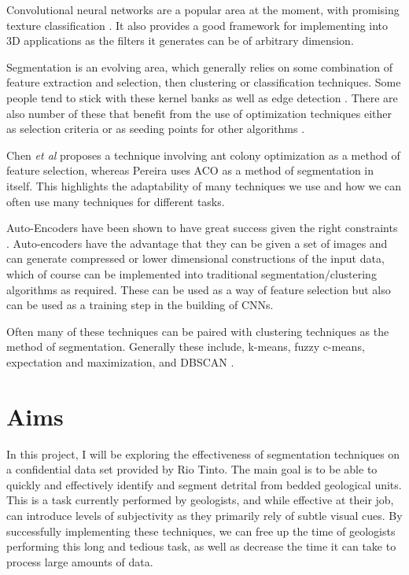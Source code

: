 \documentclass[12pt, a4paper]{article}
\begin{document}
Convolutional neural networks are a popular area at the moment, with promising texture classification \cite{cimpoi2015deep}. It also provides a good framework for implementing into 3D applications as the filters it generates can be of arbitrary dimension.

Segmentation is an evolving area, which generally relies on some combination of feature extraction and selection, then clustering or classification techniques. Some people tend to stick with these kernel banks \cite{sardar2020efficient} as well as edge detection \cite{sujatha2015performance}. There are also number of these that benefit from the use of optimization techniques either as selection criteria \cite{chen2013efficient} or as seeding points for other algorithms \cite{saug2015color}.

Chen \textit{et al} \cite{chen2013efficient} proposes a technique involving ant colony optimization as a method of feature selection, whereas Pereira \cite{pereira2015exudate} uses ACO as a method of segmentation in itself. This highlights the adaptability of many techniques we use and how we can often use many techniques for different tasks.

Auto-Encoders have been shown to have great success given the right constraints \cite{wang2017feature}. Auto-encoders have the advantage that they can be given a set of images and can generate compressed or lower dimensional constructions of the input data, which of course can be implemented into traditional segmentation/clustering algorithms as required. These can be used as a way of feature selection but also can be used as a training step in the building of CNNs.

Often many of these techniques can be paired with clustering techniques as the method of segmentation. Generally these include, k-means, fuzzy c-means, expectation and maximization, and DBSCAN \cite{dhanachandra2017survey}.


\section*{Aims}
In this project, I will be exploring the effectiveness of segmentation techniques on a confidential data set provided by Rio Tinto. The main goal is to be able to quickly and effectively  identify and segment detrital from bedded geological units. This is a task currently performed by geologists, and while effective at their job, can introduce levels of subjectivity as they primarily rely of subtle visual cues. By successfully implementing these techniques, we can free up the time of geologists performing this long and tedious task, as well as decrease the time it can take to process large amounts of data.
\end{document}
